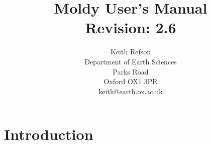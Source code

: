 % 
% 
% 
% 
\oddsidemargin=0.125in
\evensidemargin=-0.25in
\textwidth=6.25in
\topmargin=0pt
\textheight=9in
{\def\$#1${#1}%
\xdef\RCSrevision{\$Revision: 2.6 $}\xdef\manversA{$\$junk $ $}}
\title{{\Huge Moldy User's Manual}\\ \RCSrevision}
\author{Keith Refson\\Department of Earth Sciences\\Parks Road
\\Oxford OX1 3PR\\keith@earth.ox.ac.uk\\}


\newcommand{\moldy}{{\em Moldy}}
\newcommand{\etc}{{\em etc}}
\newcommand{\eg}{{\em e.g}.\ }
\newcommand{\ie}{{\em i.e}.\ }
\newcommand{\bm}[1]{\mbox{\boldmath \protect\(#1\protect\)}}

\newcommand{\erf}{\mbox{erf}}
\newcommand{\erfc}{\mbox{erfc}}
\newcommand{\insqrt}{\sqrt{\mathstrut}}

\maketitle
\tableofcontents

\chapter{Introduction}   %

